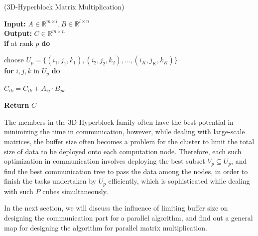 \documentclass{amsart}
\theoremstyle{definition}
\theoremstyle{remark}
\numberwithin{equation}{section}
\begin{document}
\begin{algorithm}[t] 
\caption{(3D-Hyperblock Matrix Multiplication)}
\begin{adjustwidth}{0cm}{1cm} 
\textbf{Input:} $A\in \mathbb{R}^{m\times l},B\in \mathbb{R}^{l\times n}$\\
\textbf{Output:} $C\in \mathbb{R}^{m\times n}$\\
\textbf{if} at rank $p$\textbf{ do}\\
\end{adjustwidth}
	\begin{adjustwidth}{1cm}{1cm}
	choose $U_p=\{(i_1,j_1,k_1),(i_2,j_2,k_2),...,(i_K,j_K,k_K)\}$\\
	\textbf{for} $i,j,k$ in $U_p$ \textbf{ do}
	\end{adjustwidth}
		\begin{adjustwidth}{2cm}{1cm}
		$C_{ik}=C_{ik}+A_{ij}\cdot B_{jk}$\\
		\end{adjustwidth}
\begin{adjustwidth}{0cm}{1cm} 
\textbf{Return } $C$\\
\end{adjustwidth}
\end{algorithm}
\par
	The members in the 3D-Hyperblock family often have the best potential in minimizing the time in communication, however, while dealing with large-scale matrices, the buffer size often becomes a problem for the cluster to limit the total size of data to be deployed onto each computation node. Therefore, each such optimization in communication involves deploying the best subset $V_p\subseteq U_p$, and find the best communication tree to pass the data among the nodes, in order to finish the tasks undertaken by $U_p$ efficiently, which is sophisticated while dealing with such $P$ cubes simultaneously.\par

	In the next section, we will discuss the influence of limiting buffer size on designing the communication part for a parallel algorithm, and find out a general map for designing the algorithm for parallel matrix multiplication.\par


\end{document}

